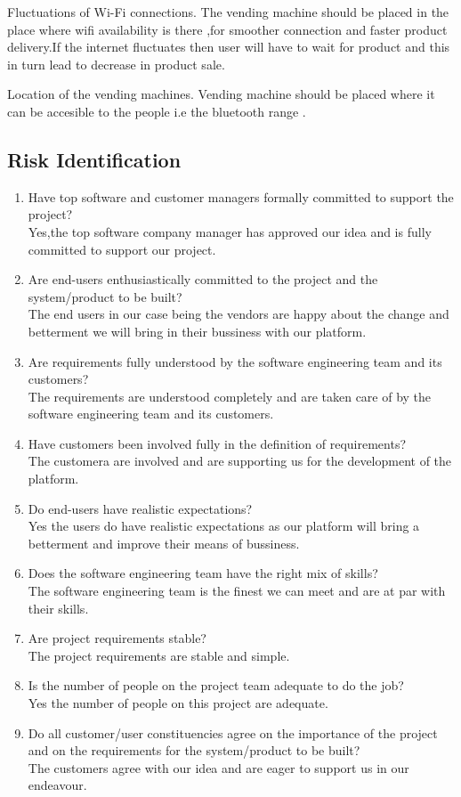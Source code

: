 \documentclass[oneside,a4paper,12pt]{report}
\begin{document}
Fluctuations of Wi-Fi connections.
The vending machine should be placed in the place where wifi availability is there ,for smoother connection and faster product delivery.If the internet fluctuates then user will have to wait for product and this in turn lead to decrease in product sale.
 
Location of the vending machines.
Vending machine should be placed where it can be accesible to the people i.e the bluetooth range .

 
\subsection{Risk Identification}
\begin{enumerate}
\item Have top software and customer managers formally committed to support the project?\\
Yes,the top software company manager has approved our idea and is fully committed to support our project.
\item Are end-users enthusiastically committed to the project and the system/product to be built?\\
The end users in our case being the vendors are happy about the change and betterment we will bring in their bussiness with our platform.
\item Are requirements fully understood by the software engineering team and its customers?\\
The requirements are understood completely and are taken care of by the software engineering team and its customers.
\item Have customers been involved fully in the definition of requirements?\\
The customera are involved and are supporting us for the development of the platform.
\item Do end-users have realistic expectations?\\
 Yes the users do have realistic expectations as our platform will bring a betterment and improve their means of bussiness.
\item Does the software engineering team have the right mix of skills?\\
The software engineering team is the finest we can meet and are at par with their skills.
\item Are project requirements stable?\\
 The project requirements are stable and simple.
\item Is the number of people on the project team adequate to do the job?\\
Yes the number of people on this project are adequate.
\item Do all customer/user constituencies agree on the importance of the project and on the requirements for the system/product to be built?\\
 The customers agree with our idea and are eager to support us in our endeavour.
\end{enumerate}
\end{document}
